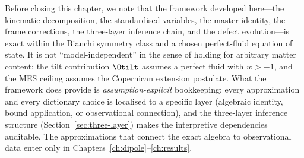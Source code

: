 Before closing this chapter, we note that the framework
developed here---the kinematic decomposition, the
standardised variables, the master identity, the frame
corrections, the three-layer inference chain, and the defect
evolution---is exact within the Bianchi symmetry class and a
chosen perfect-fluid equation of state.  It is not
``model-independent'' in the sense of holding for arbitrary
matter content: the tilt contribution $\Otilt$ assumes a
perfect fluid with $w > -1$, and the MES ceiling assumes the
Copernican extension postulate.  What the framework does provide
is \emph{assumption-explicit} bookkeeping: every approximation
and every dictionary choice is localised to a specific layer
(algebraic identity, bound application, or observational
connection), and the three-layer inference structure
(Section~\ref{sec:three-layer}) makes the interpretive
dependencies auditable.  The approximations that connect the
exact algebra to observational data enter only in
Chapters~\ref{ch:dipole}--\ref{ch:results}.








